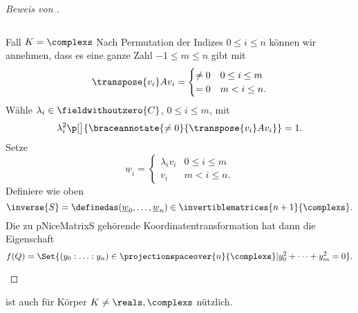 \begin{proof}[Beweis von ]
\begin{proofdescription}
\begin{equation*}
    \end{equation*}
    \item[Fall \( K=\complexs \)] Nach Permutation der Indizes \( 0\leq i \leq n \) können wir annehmen, dass es eine ganze Zahl \( -1\leq m\leq n \) gibt mit
    \begin{equation*}
      \transpose{v_i}Av_i=\begin{cases}
        \neq 0&0\leq i\leq m\\
        =0&m<i\leq n.
      \end{cases}
    \end{equation*}
    Wähle \( \lambda_i\in \fieldwithoutzero{C} \), \( 0\leq i \leq m  \), mit
    \begin{equation*}
      \lambda_i^2\p[\big]{\braceannotate{\neq 0}{\transpose{v_i}Av_i}}=1.
    \end{equation*}
    Setze
    \begin{equation*}
      \underline{w}_i=\begin{cases}
        \lambda_i v_i & 0\leq i\leq m\\
        v_i &m<i\leq n.
      \end{cases}
    \end{equation*}
    Definiere wie oben
    \begin{equation}
      \inverse{S}=\definedas(\underline{w}_0,\dotsc,\underline{w}_n)\in \invertiblematrices{n+1}{\complexs}.
    \end{equation}
    Die zu pNiceMatrixS  gehörende Koordinatentransformation hat dann die Eigenschaft
    \begin{equation*}
      f(Q)=\Set{(y_0:\dotsc:y_n)\in \projectionspaceover{n}{\complexs}|y_0^2+\dotsb+y_m^2=0}.
    \end{equation*}
  \end{proofdescription}
\end{proof}
 ist auch für Körper \( K\neq \reals,\complexs \) nützlich.
